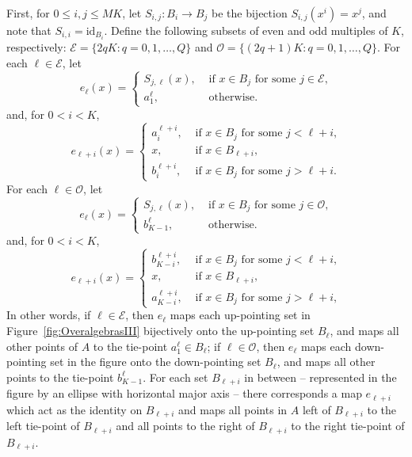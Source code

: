 \documentclass[cm,dissertation,actual,final]{uhthesis}
\theoremstyle{plain}
\theoremstyle{definition}
\theoremstyle{remark}
\numberwithin{theorem}{section}
\numberwithin{claim}{chapter}
\numberwithin{equation}{section}
\numberwithin{conjecture}{chapter}
\newcommand{\<}{\ensuremath{\langle}}
\renewcommand{\>}{\ensuremath{\rangle}}
\renewcommand{\leq}{\ensuremath{\leqslant}}
\newcommand{\supi}{\ensuremath{^{i}}}
\newcommand{\supj}{\ensuremath{^{j}}}
\newcommand{\0}{\ensuremath{\mathbf{0}}}
\newcommand{\1}{\ensuremath{\mathbf{1}}}
\newcommand{\2}{\ensuremath{\mathbf{2}}}
\newcommand{\3}{\ensuremath{\mathbf{3}}}
\newcommand{\4}{\ensuremath{\mathbf{4}}}
\newcommand{\5}{\ensuremath{\mathbf{5}}}
\newcommand{\sE}{\ensuremath{\mathscr{E}}}
\newcommand{\sO}{\ensuremath{\mathscr{O}}}
\newcommand{\id}{\ensuremath{\mathrm{id}}}
\begin{document}
First, for $0\leq i, j \leq MK$, let $S_{i,j}:B_i \rightarrow B_j $ be the 
bijection $S_{i,j}(x\supi)=x\supj$, and note that $S_{i,i} = \id_{B_i}$.
Define the following subsets of even and odd multiples of $K$, respectively: 
$\sE = \{2qK : q = 0, 1, \dots, Q\}$ and 
$\sO= \{(2q+1)K : q = 0, 1, \dots, Q\}$. 
For each $\ell\in \sE$, let\\
\[
e_{\ell}(x)=
\begin{cases}
  S_{j,\ell}(x), &\text{ if $x\in B_{j}$ for some $j \in \sE$,}\\
  a^{\ell}_1, &\text{ otherwise.}
\end{cases}
\]
and, for $0 < i < K$,
\[
e_{\ell+i}(x)=
\begin{cases}
  a_i^{\ell+i}, &\text{ if $x\in B_{j}$ for some $j < \ell+i$,}\\ 
  x, &\text{ if $x\in B_{\ell+i}$,}\\
  b_i^{\ell+i}, &\text{ if $x\in B_{j}$ for some $j > \ell+i$.}
\end{cases}
\]
For each $\ell\in \sO$, let \\
\[
e_{\ell}(x)=
\begin{cases}
  S_{j,\ell}(x), &\text{ if $x\in B_{j}$ for some $j \in \sO$,}\\
  b^{\ell}_{K-1}, &\text{ otherwise.}
\end{cases}
\]
and, for $0 < i < K$,
\[
e_{\ell+i}(x)=
\begin{cases}
  b_{K-i}^{\ell+i}, &\text{ if $x\in B_{j}$ for some $j < \ell+i$,}\\ 
  x, &\text{ if $x\in B_{\ell+i}$,}\\
  a_{K-i}^{\ell+i}, &\text{ if $x\in B_{j}$ for some $j > \ell+i$,}
\end{cases}
\]
In other words, if $\ell\in \sE$, then $e_{\ell}$ maps each up-pointing set in
Figure~\ref{fig:OveralgebrasIII} bijectively onto the up-pointing set 
$B_{\ell}$, and maps all other points of $A$ to the tie-point
$a^{\ell}_1\in B_{\ell}$; 
if $\ell\in \sO$, then $e_{\ell}$ maps each down-pointing set in the figure onto the
down-pointing set $B_{\ell}$, and maps all other points to the tie-point
$b^{\ell}_{K-1}$.  For each set $B_{\ell+i}$ in between -- represented in the
figure by an ellipse with horizontal major axis -- there corresponds a map
$e_{\ell+i}$ which act as the identity on $B_{\ell+i}$ and maps all points in
$A$ left of $B_{\ell+i}$ to the left tie-point of $B_{\ell+i}$ and all points to
the right of $B_{\ell+i}$ to the right tie-point of $B_{\ell+i}$.
\end{document}
